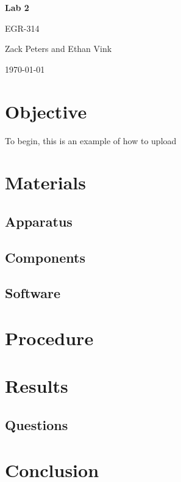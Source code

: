 \documentclass[11pt,a4paper]{article}
\newcommand{\titlestr}{Lab 2}
\newcommand{\authorstr}{Zack Peters and Ethan Vink}
\begin{document}
\begin{titlepage}
  \centering

  \vspace{1cm}
  {\LARGE \bf{\titlestr} \par}
  
  \vspace{.5cm}
  {\LARGE {EGR-314} \par}

  \vspace{1cm}
  {\Large \authorstr \par}

  \vspace{1cm}
  \today    

  \vfill
\end{titlepage}

\newpage

\tableofcontents
\newpage

\section{Objective}
To begin, this is an example of how to upload 

\section{Materials}

\subsection{Apparatus}

\subsection{Components}

\subsection{Software}

\section{Procedure}

\section{Results}

\subsection{Questions}

\section{Conclusion}
\end{document}
